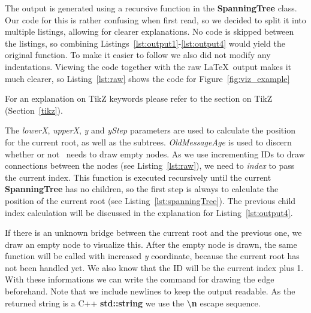 The output is generated using a recursive function in the \textbf{SpanningTree} class.
Our code for this is rather confusing when first read, so we decided to split it into multiple listings, allowing for clearer explanations.
No code is skipped between the listings, so combining Listings~\ref{lst:output1}-\ref{lst:output4} would yield the original function.
To make it easier to follow we also did not modify any indentations.
Viewing the code together with the raw \LaTeX\ output makes it much clearer, so Listing~\ref{lst:raw} shows the code for Figure~\ref{fig:viz_example}

For an explanation on TikZ keywords please refer to the section on TikZ (Section~\ref{tikz}).


The \textit{lowerX}, \textit{upperX}, \textit{y} and \textit{yStep} parameters are used to calculate the position for the current root, as well as the subtrees.
\textit{OldMessageAge} is used to discern whether or not \tool\ needs to draw empty nodes.
As we use incrementing IDs to draw connections between the nodes (see Listing~\ref{lst:raw}), we need to \textit{index} to pass the current index.
This function is executed recursively until the current \textbf{SpanningTree} has no children, so the first step is always to calculate the position of the current root (see Listing~\ref{lst:spanningTree}).
The previous child index calculation will be discussed in the explanation for Listing~\ref{lst:output4}.


If there is an unknown bridge between the current root and the previous one, we draw an empty node to visualize this.
After the empty node is drawn, the same function will be called with increased \textit{y} coordinate, because the current root has not been handled yet.
We also know that the ID will be the current index plus 1.
With these informations we can write the command for drawing the edge beforehand.
Note that we include newlines to keep the output readable.
As the returned string is a C++ \textbf{std::string} we use the \textbf{\textbackslash n} escape sequence.

